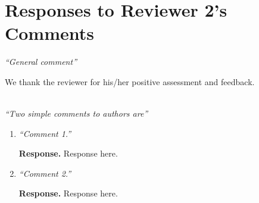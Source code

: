 \documentclass[11pt]{article}
\begin{document}
\section*{Responses to Reviewer 2's Comments}	

{\it ``General comment''}

\vspace*{0.5em} 
We thank the reviewer for
his/her positive assessment and feedback.

~\\[.1cm]
\noindent\emph{``Two simple comments to authors are''}
\begin{enumerate}[label=R2.\arabic*]

\item {\it ``Comment 1.''}

  {\bf Response.} Response here.


\item{\it ``Comment 2.''}

  {\bf Response.} Response here.
\end{enumerate}

\printmybibliography
\end{document}
